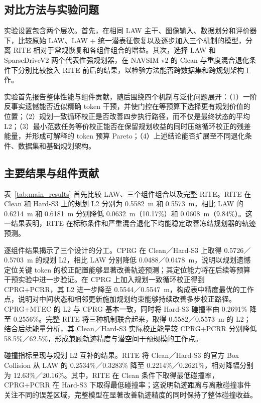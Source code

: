 \documentclass[letterpaper,10pt,conference]{ieeeconf}
\begin{document}
\subsection{对比方法与实验问题}

实验设置包含两个层次。首先，在相同 LAW 主干、图像输入、数据划分和评价器下，比较原始 LAW、LAW + 统一潜表征恢复以及逐步加入三个机制的模型，分离 RITE 相对于常规恢复和各组件组合的增益。其次，选择 LAW 和 SparseDriveV2 两个代表性强规划器，在 NAVSIM v2 的 Clean 与重度混合退化条件下分别比较接入 RITE 前后的结果，以检验方法能否跨数据集和跨规划架构工作。

实验首先报告整体性能与组件贡献，随后围绕四个机制与泛化问题展开：（1）一阶反事实遗憾能否近似精确 token 干预，并使门控在等预算下选择更有规划价值的位置；（2）规划一致循环校正是否改善四步执行路径，而不仅是最终状态的平均 L2；（3）最小范数任务等价校正能否在保留规划收益的同时压缩循环校正的残差能量，并形成可解释的 token 预算 Pareto；（4）上述结论能否扩展至不同退化条件、数据集和基础规划架构。

\subsection{主要结果与组件贡献}

表~\ref{tab:main_results} 首先比较 LAW、三个组件组合以及完整 RITE。RITE 在 Clean 和 Hard-S3 上的规划 L2 分别为 0.5582~m 和 0.5573~m，相比 LAW 的 0.6214~m 和 0.6181~m 分别降低 0.0632~m（10.17\%）和 0.0608~m（9.84\%）。这一结果表明，RITE 在标称条件和严重混合退化下均能稳定改善冻结规划器的轨迹预测。

逐组件结果揭示了三个设计的分工。CPRG 在 Clean／Hard-S3 上取得 0.5726／0.5703~m 的规划 L2，相比 LAW 分别降低 0.0488／0.0478~m，说明以规划遗憾定位关键 token 的校正配置能够显著改善轨迹预测；其定位能力将在后续等预算干预实验中进一步验证。在 CPRG 上加入规划一致循环校正得到 CPRG+PCRR，其 L2 进一步降至 0.5544／0.5547~m，构成表中精度最优的工作点，说明对中间状态和相邻更新施加规划约束能够持续改善多步校正路径。CPRG+MTEC 的 L2 与 CPRG 基本一致，同时将 Hard-S3 碰撞率由 0.2691\% 降至 0.2556\%。完整 RITE 将三种机制联合起来，取得 0.5582／0.5573~m 的 L2；结合后续能量分析，其 Clean／Hard-S3 实际校正能量较 CPRG+PCRR 分别降低 58.5\%／62.5\%，形成兼顾轨迹精度与潜空间干预规模的工作点。

碰撞指标呈现与规划 L2 互补的结果。RITE 将 Clean／Hard-S3 的官方 Box Collision 从 LAW 的 0.2534\%／0.3283\% 降至 0.2214\%／0.2621\%，相对降幅分别为 12.63\%／20.16\%。其中，RITE 在 Clean 条件下取得最低碰撞率，CPRG+PCRR 在 Hard-S3 下取得最低碰撞率；这说明轨迹距离与离散碰撞事件关注不同的误差区域，完整模型在显著改善轨迹精度的同时保持了整体碰撞收益。
\end{document}
